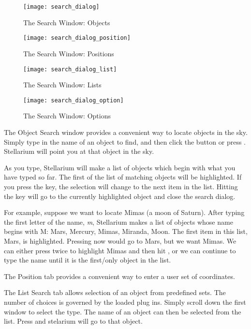 \begin{figure}[p]
\centering\texttt{[image: search\_dialog]}
\caption{The Search Window: Objects}
\label{fig:gui:search}
\end{figure}

\begin{figure}[p]
\centering\texttt{[image: search\_dialog\_position]}
\caption{The Search Window: Positions}
\label{fig:gui:search:position}
\end{figure}

\begin{figure}[p]
\centering\texttt{[image: search\_dialog\_list]}
\caption{The Search Window: Lists}
\label{fig:gui:search:position}
\end{figure}


\begin{figure}[p]
\centering\texttt{[image: search\_dialog\_option]}
\caption{The Search Window: Options}
\label{fig:gui:search:options}
\end{figure}

The Object Search window provides a convenient way to locate objects in
the sky. Simply type in the name of an object to find, and then click
the  button or press . Stellarium will point you at that
object in the sky.

As you type, Stellarium will make a list of objects which begin with
what you have typed so far. The first of the list of matching objects
will be highlighted. If you press the  key, the selection will change
to the next item in the list. Hitting the  key will go to the
currently highlighted object and close the search dialog.

For example, suppose we want to locate Mimas (a moon of Saturn). After
typing the first letter of the name, \emph{m}, Stellarium makes a list
of objects whose name begins with M: Mars, Mercury, Mimas, Miranda,
Moon. The first item in this list, Mars, is highlighted. Pressing 
now would go to Mars, but we want Mimas. We can either press  twice
to highlight Mimas and then hit , or we can continue to type the
name until it is the first/only object in the list.


The Position tab provides a convenient way to enter a user set
of coordinates.


The List Search tab allows selection of an object from predefined
sets.  The number of choices is governed by the loaded plug
ins. Simply scroll down the first window to select the type. The name
of an object can then be selected from the list. Press  and
stelarium will go to that object.


